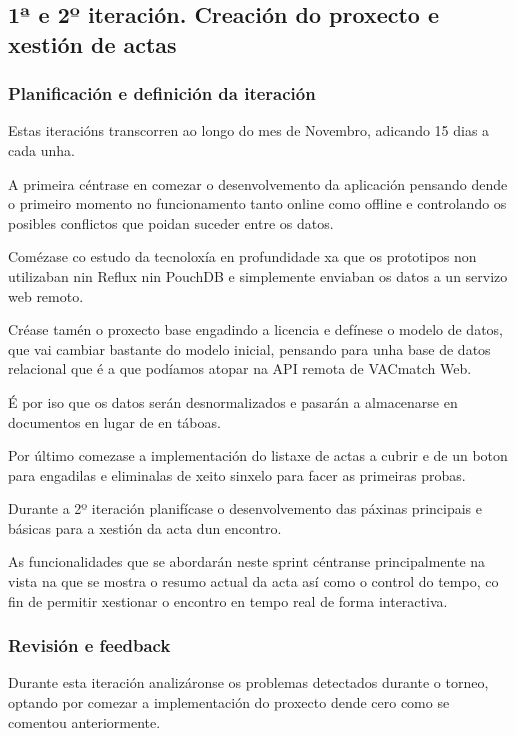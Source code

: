     \subsection{1ª e 2º iteración. Creación do proxecto e xestión de actas}

      \subsubsection{Planificación e definición da iteración}
      Estas iteracións transcorren ao longo do mes de Novembro, adicando 15 
dias a cada unha.

      A primeira céntrase en comezar o desenvolvemento da 
aplicación pensando dende o primeiro momento no funcionamento tanto online 
como offline e controlando os posibles conflictos que poidan suceder entre os 
datos.

      Comézase co estudo da tecnoloxía en profundidade xa que os 
prototipos non utilizaban nin Reflux nin PouchDB e simplemente enviaban os 
datos a un servizo web remoto.

      Créase tamén o proxecto base engadindo a licencia e defínese o modelo de 
datos, que vai cambiar bastante do modelo inicial, pensando para unha base de 
datos relacional que é a que podíamos atopar na API remota de VACmatch Web.

      É por iso que os datos serán desnormalizados e pasarán a almacenarse en 
documentos en lugar de en táboas.

      Por último comezase a implementación do listaxe de actas a cubrir e de un 
boton para engadilas e eliminalas de xeito sinxelo para facer as primeiras 
probas.

        Durante a 2º iteración planifícase o desenvolvemento das páxinas 
principais e básicas para a xestión da acta dun encontro.

      As funcionalidades que se abordarán neste sprint céntranse principalmente 
na vista na que se mostra o resumo actual da acta así como o control do tempo, 
co fin de permitir xestionar o encontro en tempo real de forma interactiva.

      \subsubsection{Revisión e feedback}
      Durante esta iteración analizáronse os problemas detectados durante o 
torneo, optando por comezar a implementación do proxecto dende cero como se 
comentou anteriormente.

